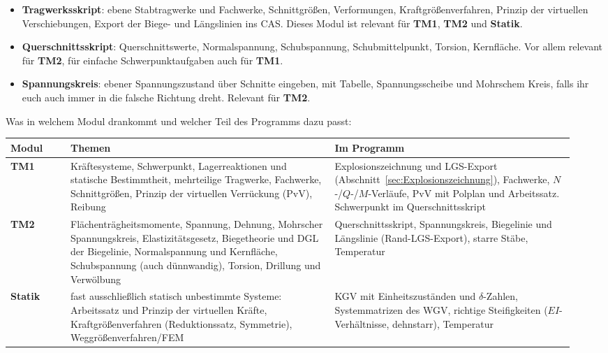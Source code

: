 \begin{itemize}
  \item \textbf{Tragwerksskript}: ebene Stabtragwerke und Fachwerke, Schnittgrößen,
        Verformungen, Kraftgrößenverfahren, Prinzip der virtuellen Verschiebungen, Export der Biege- und Längslinien ins CAS. Dieses Modul ist relevant für \textbf{TM1}, \textbf{TM2} und \textbf{Statik}.

  \item \textbf{Querschnittsskript}: Querschnittswerte,
        Normalspannung, Schubspannung, Schubmittelpunkt, Torsion, Kernfläche. Vor allem relevant für \textbf{TM2}, für einfache Schwerpunktaufgaben auch für \textbf{TM1}.

  \item \textbf{Spannungskreis}: ebener Spannungszustand über Schnitte eingeben, mit Tabelle,
        Spannungsscheibe und Mohrschem Kreis, falls ihr euch auch immer in die falsche Richtung dreht. Relevant für \textbf{TM2}.
\end{itemize}

Was in welchem Modul drankommt und welcher Teil des Programms dazu passt:

\begin{longtable}{p{0.10\linewidth}p{0.44\linewidth}p{0.40\linewidth}}
  \toprule
  \textbf{Modul} & \textbf{Themen} & \textbf{Im Programm} \\
  \midrule \endhead
  \textbf{TM1} & Kräftesysteme, Schwerpunkt, Lagerreaktionen und statische Bestimmtheit,
    mehrteilige Tragwerke, Fachwerke, Schnittgrößen, Prinzip der virtuellen Verrückung (PvV),
    Reibung &
    Explosionszeichnung und LGS-Export (Abschnitt~\ref{sec:Explosionszeichnung}), Fachwerke,
    $N$-/$Q$-/$M$-Verläufe, PvV mit Polplan und Arbeitssatz. Schwerpunkt im Querschnittsskript \\
  \textbf{TM2} & Flächenträgheitsmomente, Spannung, Dehnung, Mohrscher Spannungskreis,
    Elastizitätsgesetz, Biegetheorie und DGL der Biegelinie, Normalspannung und Kernfläche,
    Schubspannung (auch dünnwandig), Torsion, Drillung und Verwölbung &
    Querschnittsskript, Spannungskreis, Biegelinie und Längslinie (Rand-LGS-Export), starre
    Stäbe, Temperatur \\
  \textbf{Statik} & fast ausschließlich statisch unbestimmte Systeme: Arbeitssatz und Prinzip der
    virtuellen Kräfte, Kraftgrößenverfahren (Reduktionssatz, Symmetrie), Weggrößenverfahren/FEM&
    KGV mit Einheitszuständen und $\delta$-Zahlen, Systemmatrizen des WGV, richtige Steifigkeiten
    ($EI$-Verhältnisse, dehnstarr), Temperatur \\
  \bottomrule
\end{longtable}

